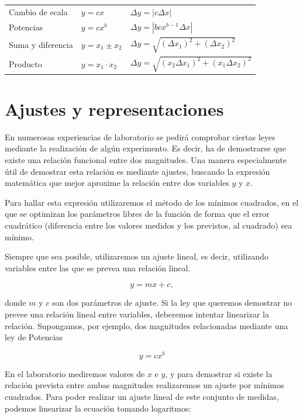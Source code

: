\documentclass{book}
\begin{document}
\begin{center}
  \renewcommand{\arraystretch}{1.75}
  \begin{tabular}{lll}
    Cambio de ecala & $y = c x$ & $\Delta y = | c \Delta x |$  \\
    Potencias & $y = c x^b$ & $\Delta y = | b c x^{b-1} \Delta x|$ \\
    Suma y diferencia & $y = x_1 \pm x_2$ & $\Delta y = \sqrt{(\Delta x_1)^2 + (\Delta x_2)^2}$ \\
    Producto & $y = x_1 \cdot x_2$ & $\Delta y = \sqrt{(x_2 \Delta x_1)^2 + (x_1 \Delta x_2)^2}$ \\ 
  \end{tabular} 
\end{center}


\section{Ajustes y representaciones}

En numerosas experiencias de laboratorio se pedirá comprobar ciertas leyes mediante la realización
de algún experimento. Es decir, ha de demostrarse que existe una relación funcional entre dos
magnitudes. Una manera especialmente útil de demostrar esta relación es mediante ajustes, buscando
la expresión matemática que mejor aproxime la relación entre dos variables $y$ y $x$.

Para hallar esta expresión utilizaremos el método de los mínimos cuadrados, en el que se optimizan
los parámetros libres de la función de forma que el error cuadrático (diferencia entre los valores
medidos y los previstos, al cuadrado) sea mínimo.

Siempre que sea posible, utilizaremos un ajuste lineal, es decir, utilizando variables entre las
que se prevea una relación lineal. 

\begin{equation}
  y = m x + c ,
\end{equation}

donde $m$ y $c$ son dos parámetros de ajuste. Si la ley que queremos demostrar no prevee una 
relación lineal
entre variables, deberemos intentar linearizar la relación. Supongamos, por ejemplo, dos magnitudes
relacionadas mediante una ley de Potencias

\begin{equation}
  y = c x^b
\end{equation}

En el laboratorio mediremos valores de $x$ e $y$, y para demostrar si existe la relación prevista
entre ambas magnitudes realizaremos un ajuste por mínimos cuadrados. Para poder realizar un ajuste
lineal de este conjunto de medidas, podemos linearizar la ecuación tomando logaritmos:
\end{document}
